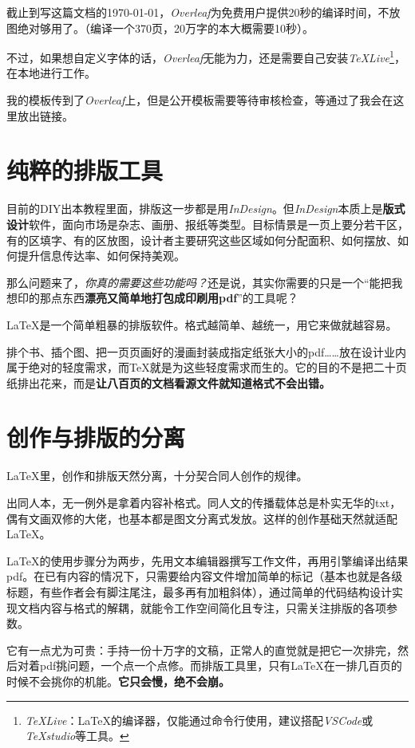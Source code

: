 \documentclass[10pt,openany]{book}
\begin{document}
\begin{sloppypar}
    截止到写这篇文档的\today，\textit{Overleaf}为免费用户提供20秒的编译时间，不放图绝对够用了。（编译一个370页，20万字的本大概需要10秒）。

    不过，如果想自定义字体的话，\textit{Overleaf}无能为力，还是需要自己安装\textit{TeXLive}\footnote{\textit{TeXLive}：{\LaTeX}的编译器，仅能通过命令行使用，建议搭配\textit{VSCode}或\textit{TeXstudio}等工具。}，在本地进行工作。

    我的模板传到了\textit{Overleaf}上，但是公开模板需要等待审核检查，等通过了我会在这里放出链接。

    \section{纯粹的排版工具}

    目前的DIY出本教程里面，排版这一步都是用\textit{InDesign}。但\textit{InDesign}本质上是\textbf{版式设计}软件，面向市场是杂志、画册、报纸等类型。目标情景是一页上要分若干区，有的区填字、有的区放图，设计者主要研究这些区域如何分配面积、如何摆放、如何提升信息传达率、如何保持美观。

    那么问题来了，\emph{你真的需要这些功能吗？}还是说，其实你需要的只是一个“能把我想印的那点东西\textbf{漂亮又简单地打包成印刷用pdf}”的工具呢？

    {\LaTeX}是一个简单粗暴的排版软件。格式越简单、越统一，用它来做就越容易。

    排个书、插个图、把一页页画好的漫画封装成指定纸张大小的pdf……放在设计业内属于绝对的轻度需求，而{\TeX}就是为这些轻度需求而生的。它的目的不是把二十页纸排出花来，而是\textbf{让八百页的文档看源文件就知道格式不会出错。}

    \section{创作与排版的分离}

     {\LaTeX}里，创作和排版天然分离，十分契合同人创作的规律。

    出同人本，无一例外是拿着内容补格式。同人文的传播载体总是朴实无华的txt，偶有文画双修的大佬，也基本都是图文分离式发放。这样的创作基础天然就适配{\LaTeX}。

    {\LaTeX}的使用步骤分为两步，先用文本编辑器撰写工作文件，再用引擎编译出结果pdf。在已有内容的情况下，只需要给内容文件增加简单的标记（基本也就是各级标题，有些作者会有脚注尾注，最多再有加粗斜体），通过简单的代码结构设计实现文档内容与格式的解耦，就能令工作空间简化且专注，只需关注排版的各项参数。

    它有一点尤为可贵：手持一份十万字的文稿，正常人的直觉就是把它一次排完，然后对着pdf挑问题，一个点一个点修。而排版工具里，只有{\LaTeX}在一排几百页的时候不会挑你的机能。\textbf{它只会慢，绝不会崩。}


\end{sloppypar}
\end{document}

